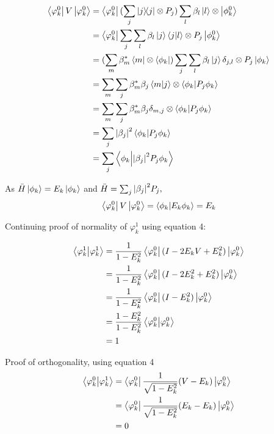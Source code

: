 \documentclass{article}
\def\kb#1#2{| #1 \rangle\!\langle #2 |}
\begin{document}
\begin{align*}
\bra{\varphi_k^0} V \ket{\varphi_k^0} &= \bra{\varphi_k^0} (\sum_j \kb j j \otimes P_j) \sum_l \beta_l \ket{l} \otimes \ket{\phi_k^0}\\
&= \bra{\varphi_k^0}\sum_j \sum_l \beta_l \ket{j} \braket{j}{l} \otimes P_j \ket{\phi_k^0}\\
&=(\sum_m \beta_m^* \bra{m} \otimes \bra{\phi_k}) \sum_j \sum_l \beta_l \ket{j} \delta_{j,l} \otimes P_j \ket{\phi_k}\\
&= \sum_m \sum_j \beta_m^* \beta_j \braket{m}{j} \otimes \braket{\phi_k}{P_j \phi_k}\\
&= \sum_m \sum_j \beta_m^* \beta_j \delta_{m,j} \otimes \braket{\phi_k}{P_j \phi_k}\\
&= \sum_j \abs{\beta_j}^2 \braket{\phi_k}{P_j \phi_k}\\
&= \sum_j \braket{\phi_k}{ \abs{\beta_j}^2  P_j \phi_k}
\end{align*}

As $\bar{H}\left\vert{\phi_k}\right\rangle = E_k\left\vert{\phi_k}\right\rangle$ and $\bar{H} = \sum_j \abs{\beta_j}^2  P_j,$
\begin{equation}
\left\langle{\varphi_k^0}\right\vert V \left\vert{\varphi_k^0}\right\rangle = \braket{\phi_k}{E_k \phi_k}
= E_k
\end{equation}

Continuing proof of normality of $\varphi_k^1$ using equation 4:



\begin{align*}
\braket{\varphi_k^1}{\varphi_k^1} &= \frac{1}{1 - E^2_k} \left\langle{\varphi_k^0}\right\vert (I - 2 E_kV + E_k^2) \left\vert{\varphi_k^0}\right\rangle\\
&= \frac{1}{1 - E^2_k} \left\langle{\varphi_k^0}\right\vert (I - 2 E_k^2 + E_k^2) \left\vert{\varphi_k^0}\right\rangle\\
&= \frac{1}{1 - E^2_k} \left\langle{\varphi_k^0}\right\vert (I -  E_k^2) \left\vert{\varphi_k^0}\right\rangle\\
&= \frac{1- E^2_k}{1 - E^2_k} \braket{\varphi_k^0}{\varphi_k^0}\\
&= 1
\end{align*}

Proof of orthogonality, using equation 4
\begin{align*}
\braket{\varphi_k^0}{\varphi_k^1} &= \left\langle{\varphi_k^0}\right\vert  \frac{1}{\sqrt{1 - E^2_k}}(V-E_k) \left\vert{\varphi_k^0}\right\rangle\\
&= \left\langle{\varphi_k^0}\right\vert  \frac{1}{\sqrt{1 - E^2_k}}(E_k-E_k) \left\vert{\varphi_k^0}\right\rangle\\
&= 0
\end{align*}
\end{document}
